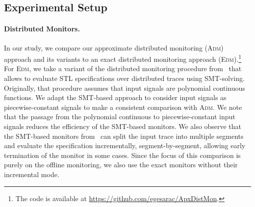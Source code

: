 \subsection{Experimental Setup}

\paragraph*{Distributed Monitors.}
In our study, we compare our approximate distributed monitoring (\textsc{Adm}) approach and its variants to an exact distributed monitoring approach (\textsc{Edm}).\footnote[1]{The code is available at \url{https://github.com/egesarac/ApxDistMon}.}
For \textsc{Edm}, we take a variant of the distributed monitoring procedure from~\cite{MomtazAB23} that allows to evaluate STL specifications over distributed traces using SMT-solving.
Originally, that procedure assumes that input signals are polynomial continuous functions.
We adapt the SMT-based approach to consider input signals as piecewise-constant signals to make a consistent comparison with \textsc{Adm}.
We note that the passage from the polynomial continuous to piecewise-constant input signals reduces the efficiency of the SMT-based monitors.
We also observe that the SMT-based monitors from~\cite{MomtazAB23} can split the input trace into multiple segments and evaluate the specification incrementally, segment-by-segment, allowing early termination of the monitor in some cases.
Since the focus of this comparison is purely on the offline monitoring, we also use the exact monitors without their incremental mode.


